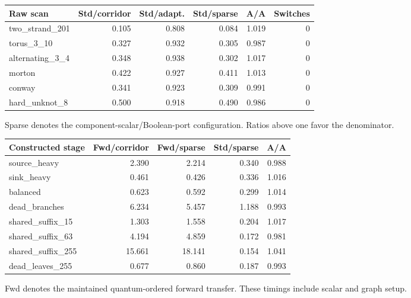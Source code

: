 \begin{center}
\begin{tabular}{@{}lrrrrr@{}}
\toprule
Raw scan & Std/corridor & Std/adapt. & Std/sparse & A/A & Switches \\
\midrule
two\_strand\_201 & 0.105 & 0.808 & 0.084 & 1.019 & 0 \\
torus\_3\_10 & 0.327 & 0.932 & 0.305 & 0.987 & 0 \\
alternating\_3\_4 & 0.348 & 0.938 & 0.302 & 1.017 & 0 \\
morton & 0.422 & 0.927 & 0.411 & 1.013 & 0 \\
conway & 0.341 & 0.923 & 0.309 & 0.991 & 0 \\
hard\_unknot\_8 & 0.500 & 0.918 & 0.490 & 0.986 & 0 \\
\bottomrule
\end{tabular}
\end{center}
Sparse denotes the component-scalar/Boolean-port configuration. Ratios above one favor the denominator.
\begin{center}
\begin{tabular}{@{}lrrrr@{}}
\toprule
Constructed stage & Fwd/corridor & Fwd/sparse & Std/sparse & A/A \\
\midrule
source\_heavy & 2.390 & 2.214 & 0.340 & 0.988 \\
sink\_heavy & 0.461 & 0.426 & 0.336 & 1.016 \\
balanced & 0.623 & 0.592 & 0.299 & 1.014 \\
dead\_branches & 6.234 & 5.457 & 1.188 & 0.993 \\
shared\_suffix\_15 & 1.303 & 1.558 & 0.204 & 1.017 \\
shared\_suffix\_63 & 4.194 & 4.859 & 0.172 & 0.981 \\
shared\_suffix\_255 & 15.661 & 18.141 & 0.154 & 1.041 \\
dead\_leaves\_255 & 0.677 & 0.860 & 0.187 & 0.993 \\
\bottomrule
\end{tabular}
\end{center}
Fwd denotes the maintained quantum-ordered forward transfer. These timings include scalar and graph setup.

